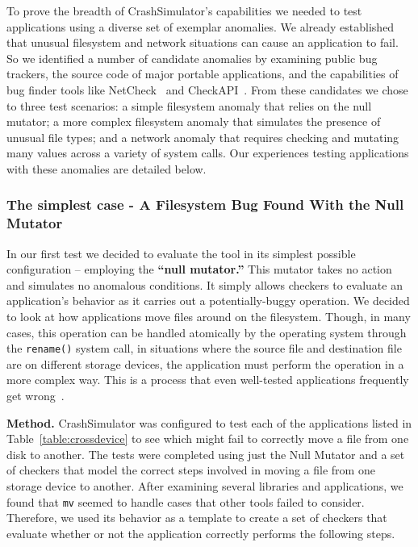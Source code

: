 To prove the breadth of CrashSimulator's capabilities we needed
to test applications
using a diverse set of exemplar anomalies.
We already established
that
unusual filesystem and network situations can cause an application to fail.
So we identified a number of candidate anomalies
by examining public bug trackers,
the source code of major portable applications, and the capabilities of
bug finder tools like NetCheck~\cite{Zhuang_NSDI_2014}
and CheckAPI~\cite{rasley2015detecting}.
From these candidates we
chose to three test scenarios: a simple filesystem anomaly that relies on the null
mutator;
a more complex filesystem anomaly that simulates
the presence of unusual file types;
and a network anomaly that requires
checking and mutating many values across a variety of system calls.
Our experiences testing applications with these anomalies are detailed below.

\subsubsection{The simplest case - A Filesystem Bug Found With the Null Mutator}
\label{sec-move-bugs}
In our first test we decided to evaluate the tool in its simplest possible
configuration -- employing the {\bf ``null mutator.''}
This mutator takes no action and simulates no anomalous conditions.
It simply allows checkers to evaluate an application's behavior
as it carries out a potentially-buggy operation.
We decided to look at how applications
move files around on the filesystem.
Though, in many cases, this operation can be handled
atomically by the operating system
through the {\tt rename()} system call,
in situations where
the source file and destination file are on different storage devices,
the application must perform the operation in a more complex way.
This is a process
that even well-tested applications
frequently get wrong~\cite{PHPRenameBug,PythonShutilBug,NodejsCopyBug}.

{\bf Method.}
CrashSimulator was configured
to test each of the applications listed in Table~\ref{table:crossdevice}
to see which might fail to correctly move a file from one disk to another.
The tests were completed using just the Null Mutator and a set of
checkers that model the correct steps involved in moving a file from one
storage device to another.
After examining several libraries and applications,
we found that
{\tt mv} seemed to handle cases that other tools failed to consider.
Therefore, we
used its behavior as a template to create a set of checkers
that evaluate whether or not
the application correctly performs the following
steps.

